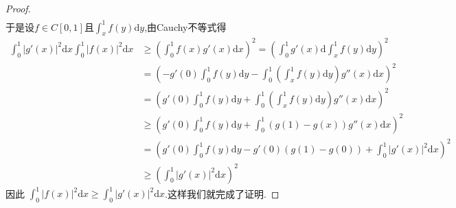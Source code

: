 \documentclass[../../main.tex]{subfiles}
\begin{document}
\begin{proof}
\begin{align*}
\end{align*}
于是设$f\in C\left[ 0,1 \right]\text{且}\int_x^1{f\left( y \right) \mathrm{d}y}$,由Cauchy不等式得
\begin{align*}
\int_0^1 |g'(x)|^2 \mathrm{d}x \int_0^1 |f(x)|^2 \mathrm{d}x &\geqslant \left( \int_0^1 f(x) g'(x) \mathrm{d}x \right)^2 = \left( \int_0^1 g'(x) \mathrm{d} \int_x^1 f(y) \mathrm{d}y \right)^2 \\
&= \left( -g'(0) \int_0^1 f(y) \mathrm{d}y - \int_0^1 \left( \int_x^1 f(y) \mathrm{d}y \right) g''(x) \mathrm{d}x \right)^2 \\
&= \left( g'(0) \int_0^1 f(y) \mathrm{d}y + \int_0^1 \left( \int_x^1 f(y) \mathrm{d}y \right) g''(x) \mathrm{d}x \right)^2 \\
&\geqslant \left( g'(0) \int_0^1 f(y) \mathrm{d}y + \int_0^1 (g(1) - g(x)) g''(x) \mathrm{d}x \right)^2 \\
&= \left( g'(0) \int_0^1 f(y) \mathrm{d}y - g'(0) (g(1) - g(0)) + \int_0^1 |g'(x)|^2 \mathrm{d}x \right)^2 \\
&\geqslant \left( \int_0^1 |g'(x)|^2 \mathrm{d}x \right)^2
\end{align*}
因此 $\int_0^1 |f(x)|^2 \mathrm{d}x \geqslant \int_0^1 |g'(x)|^2 \mathrm{d}x$.这样我们就完成了证明.

\end{proof}
\end{document}
